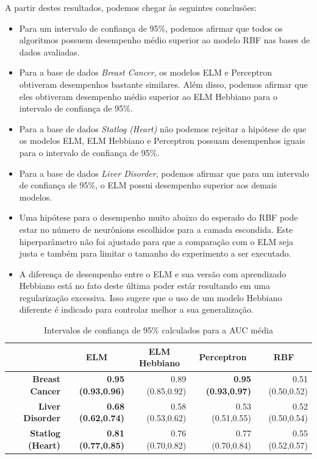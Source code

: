 \documentclass[conference]{IEEEtran}
\begin{document}
	A partir destes resultados, podemos chegar às seguintes conclusões:
	\begin{itemize}
		\item Para um intervalo de confiança de 95\%, podemos afirmar que todos os algoritmos possuem desempenho médio superior ao modelo RBF nas bases de dados avaliadas.
		\item Para a base de dados \textit{Breast Cancer}, os modelos ELM e Perceptron obtiveram desempenhos bastante similares. Além disso, podemos afirmar que eles obtiveram desempenho médio superior ao ELM Hebbiano para o intervalo de confiança de 95\%.
		\item Para a base de dados \textit{Statlog (Heart)} não podemos rejeitar a hipótese de que os modelos ELM, ELM Hebbiano e Perceptron possuam desempenhos iguais para o intervalo de confiança de 95\%.
		\item Para a base de dados \textit{Liver Disorder}, podemos afirmar que para um intervalo de confiança de 95\%, o ELM possui desempenho superior aos demais modelos.
		\item Uma hipótese para o desempenho muito abaixo do esperado do RBF pode estar no número de neurônions escolhidos para a camada escondida. Este hiperparâmetro não foi ajustado para que a comparação com o ELM seja justa e também para limitar o tamanho do experimento a ser executado. 
		\item A diferença de desempenho entre o ELM e sua versão com aprendizado Hebbiano está no fato deste última poder estár resultando em uma regularização excessiva. Isso sugere que o uso de um modelo Hebbiano diferente é indicado para controlar melhor a sua generalização.
	\end{itemize}

	\begin{table}[thpbh]
		\caption{Intervalos de confiança de 95\% calculados para a AUC média}
		\label{tab:classification}
		\centering
		\begin{tabular}{r|r|r|r|r|}
			\cline{2-5}
			\multicolumn{1}{l|}{}                          & \multicolumn{1}{c|}{\textbf{ELM}} & \multicolumn{1}{c|}{\textbf{ELM Hebbiano}} & \multicolumn{1}{c|}{\textbf{Perceptron}} & \multicolumn{1}{c|}{\textbf{RBF}} \\ \hline
			\multicolumn{1}{|r|}{\textbf{Breast Cancer}}   & \textbf{0.95 (0.93,0.96)}         & 0.89 (0.85,0.92)                           & \textbf{0.95 (0.93,0.97)}                & 0.51 (0.50,0.52)                  \\ \hline
			\multicolumn{1}{|r|}{\textbf{Liver Disorder}}  & \textbf{0.68 (0.62,0.74)}         & 0.58 (0.53,0.62)                           & 0.53 (0.51,0.55)                         & 0.52 (0.50,0.54)                  \\ \hline
			\multicolumn{1}{|r|}{\textbf{Statlog (Heart)}} & \textbf{0.81 (0.77,0.85)}         & 0.76 (0.70,0.82)                           & 0.77 (0.70,0.84)                         & 0.55 (0.52,0.57)                  \\ \hline
		\end{tabular}
	\end{table}
\end{document}
